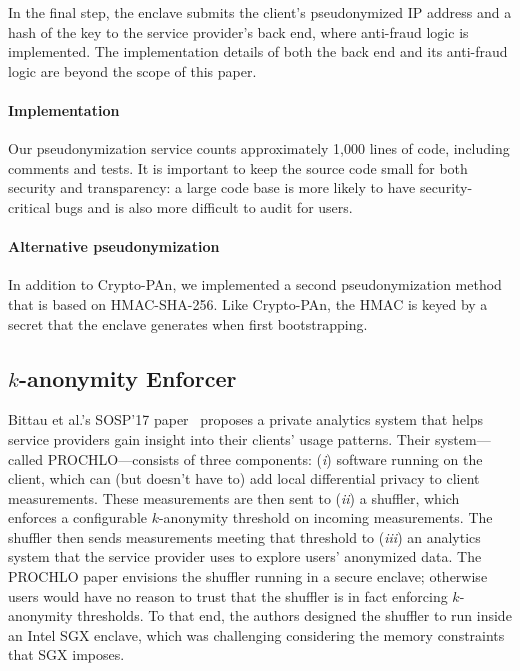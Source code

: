 In the final step, the enclave submits the client's pseudonymized IP address and
a hash of the key to the service provider's back end, where anti-fraud logic is
implemented.  The implementation details of both the back end and its anti-fraud
logic are beyond the scope of this paper.

\paragraph{Implementation}
Our pseudonymization service counts approximately 1,000 lines of code, including
comments and tests.  It is important to keep the source code small for both
security and transparency: a large code base is more likely to have
security-critical bugs and is also more difficult to audit for users.

\paragraph{Alternative pseudonymization}
In addition to Crypto-PAn, we implemented a second pseudonymization method that
is based on HMAC-SHA-256.  Like Crypto-PAn, the HMAC is keyed by a secret that
the enclave generates when first bootstrapping.

\subsection{$k$-anonymity Enforcer}
\label{sec:shuffler}

Bittau et al.'s SOSP'17 paper~\cite{Bittau2017a} proposes a private analytics
system that helps service providers gain insight into their clients' usage
patterns.  Their system---called PROCHLO---consists of three components:
(\emph{i}) software running on the client, which can (but doesn't have to) add
local differential privacy to client measurements.  These measurements are then
sent to (\emph{ii}) a shuffler, which enforces a configurable $k$-anonymity
threshold on incoming measurements.  The shuffler then sends measurements meeting that threshold
to (\emph{iii}) an analytics system that the service provider uses
to explore users' anonymized data.  The PROCHLO paper envisions the shuffler
running in a secure enclave; otherwise users would have no reason to trust that the
shuffler is in fact enforcing $k$-anonymity thresholds.  To that end, the
authors designed the shuffler to run inside an Intel SGX enclave, which was
challenging considering the memory constraints that SGX imposes.


